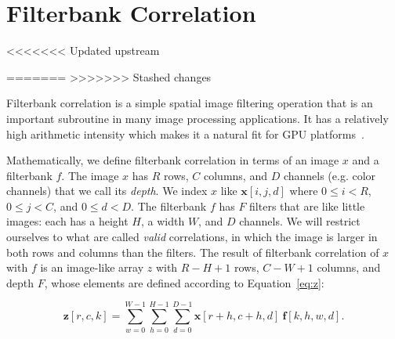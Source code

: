 \documentclass{sig-alternate}
\begin{document}
\section{Filterbank Correlation}

\label{sec:fbcorr}

<<<<<<< Updated upstream

=======
% 
>>>>>>> Stashed changes

Filterbank correlation is a simple spatial image filtering operation that is
an important subroutine in many image processing applications. It has a relatively
high arithmetic intensity which makes it a natural fit for GPU platforms~\citep{pinto+cox:2011gcg}.

Mathematically, we define filterbank correlation in terms of an
image $x$ and a filterbank $f$.
The image $x$ has $R$ rows, $C$ columns, and $D$ channels (e.g. color
channels) that we call its {\em depth}. We index $x$ like $\mathbf{x}[i,j,d]$
where $0 \leq i < R$, $0 \leq j < C$, and $0 \leq d < D$.
The filterbank $f$ has $F$ filters that are like little images: each has a
height $H$, a width $W$, and $D$ channels.
We will restrict ourselves to what are called {\em valid} correlations, in
which the image is larger in both rows and columns than the filters.
The result of filterbank correlation of $x$ with $f$ is an image-like array
$z$ with $R-H+1$ rows, $C-W+1$ columns, and depth $F$, whose elements are
defined according to Equation~\ref{eq:z}:

\begin{equation}
    \mathbf{z}[r,c,k] = \sum_{w=0}^{W-1} \sum_{h=0}^{H-1} \sum_{d=0}^{D-1}
        \mathbf{x}[r+h, c+h, d]~ \mathbf{f}[k, h, w, d].
        \label{eq:z}
\end{equation}
\end{document}
